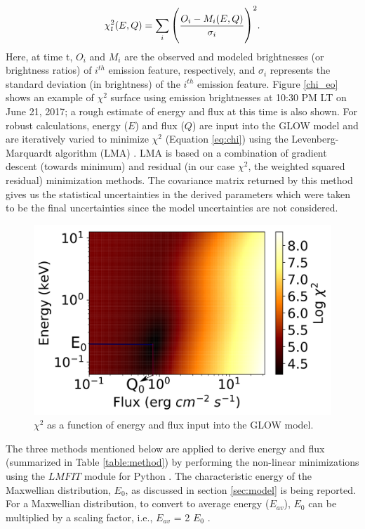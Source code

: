 \documentclass[crop=false,class=mitthesis,oneside,font=12pt]{standalone}
\begin{document}
\begin{equation}
\large
\chi^{2}_t (E,Q) = \sum_{i}\Bigg({\frac{O_{i} - M_{i} (E,Q)} {\sigma_{i}}}\Bigg)^{2}.
\label{eq:chi}
\end{equation}
Here, at time t, $O_{i}$ and $M_{i}$ are the observed and modeled brightnesses (or brightness ratios) of $ i^{th}$ emission feature, respectively, and $\sigma_{i}$ represents the standard deviation (in brightness) of the $ i^{th}$ emission feature. Figure \ref{chi_eo} shows an example of $\chi^2$ surface using emission brightnesses at 10:30 PM LT on June 21, 2017; a rough estimate of energy and flux at this time is also shown. For robust calculations, energy ($E$) and flux ($Q$) are input into the GLOW model and are iteratively varied to minimize $\chi^2$ (Equation \ref{eq:chi}) using the Levenberg-Marquardt algorithm (LMA) \citep{levenberg,marquardt}. LMA is based on a combination of gradient descent (towards minimum) and residual (in our case $\chi^2$, the weighted squared residual) minimization methods. The covariance matrix returned by this method gives us the statistical uncertainties in the derived parameters which were taken to be the final uncertainties since the model uncertainties are not considered. 
\begin{figure}[H]
	\centering\includegraphics[width=35pc]{chi_eo.png}
	\caption{ $\chi^2$ as a function of energy and flux input into the GLOW model.}
	\label{fig:chi_eo}
\end{figure}

The three methods mentioned below are applied to derive energy and flux (summarized in Table \ref{table:method}) by performing the non-linear minimizations using the $LMFIT$ module for Python \citep{lmfit}. The characteristic energy of the Maxwellian distribution, $E_0$, as discussed in section \ref{sec:model} is being reported. For a Maxwellian distribution, to convert to average energy ($E_{av}$), $E_0$ can be multiplied by a scaling factor, i.e., $E_{av}$ = 2 $E_0$ \citep{kosch_2001}.
\end{document}
